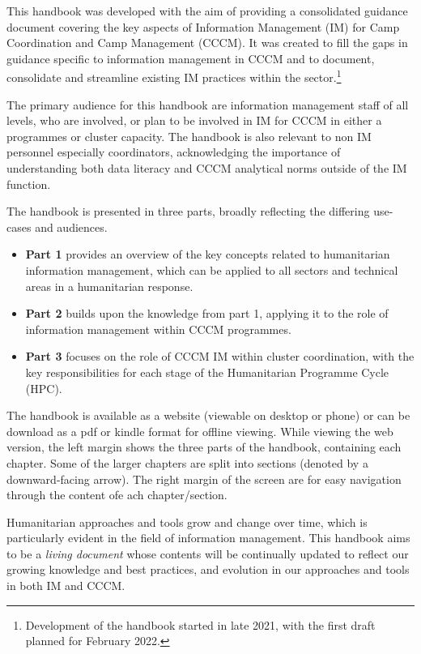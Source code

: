 \documentclass[
  a4paper,
  onecolumn,
  oneside]{book}
\begin{document}
This handbook was developed with the aim of providing a consolidated
guidance document covering the key aspects of Information Management
(IM) for Camp Coordination and Camp Management (CCCM). It was created to
fill the gaps in guidance specific to information management in CCCM and
to document, consolidate and streamline existing IM practices within the
sector.\footnote{Development of the handbook started in late 2021, with
  the first draft planned for February 2022.}

The primary audience for this handbook are information management staff
of all levels, who are involved, or plan to be involved in IM for CCCM
in either a programmes or cluster capacity. The handbook is also
relevant to non IM personnel especially coordinators, acknowledging the
importance of understanding both data literacy and CCCM analytical norms
outside of the IM function.

The handbook is presented in three parts, broadly reflecting the
differing use-cases and audiences.

\begin{itemize}
\item
  \textbf{Part 1} provides an overview of the key concepts related to
  humanitarian information management, which can be applied to all
  sectors and technical areas in a humanitarian response.
\item
  \textbf{Part 2} builds upon the knowledge from part 1, applying it to
  the role of information management within CCCM programmes.
\item
  \textbf{Part 3} focuses on the role of CCCM IM within cluster
  coordination, with the key responsibilities for each stage of the
  Humanitarian Programme Cycle (HPC).
\end{itemize}

The handbook is available as a website (viewable on desktop or phone) or
can be download as a pdf or kindle format for offline viewing. While
viewing the web version, the left margin shows the three parts of the
handbook, containing each chapter. Some of the larger chapters are split
into sections (denoted by a downward-facing arrow). The right margin of
the screen are for easy navigation through the content ofe ach
chapter/section.

Humanitarian approaches and tools grow and change over time, which is
particularly evident in the field of information management. This
handbook aims to be a \emph{living document} whose contents will be
continually updated to reflect our growing knowledge and best practices,
and evolution in our approaches and tools in both IM and CCCM.
\end{document}
